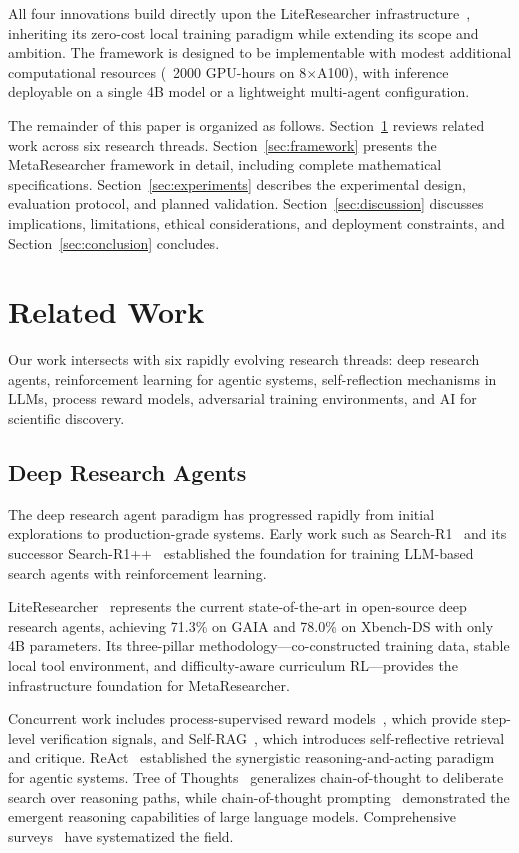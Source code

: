 \documentclass[notspecified,article,accept,pdftex,moreauthors]{Definitions/mdpi}
\begin{document}
All four innovations build directly upon the LiteResearcher infrastructure~\cite{b1}, inheriting its zero-cost local training paradigm while extending its scope and ambition. The framework is designed to be implementable with modest additional computational resources (~2000 GPU-hours on 8$\times$A100), with inference deployable on a single 4B model or a lightweight multi-agent configuration.

The remainder of this paper is organized as follows. Section~\ref{sec:related} reviews related work across six research threads. Section~\ref{sec:framework} presents the MetaResearcher framework in detail, including complete mathematical specifications. Section~\ref{sec:experiments} describes the experimental design, evaluation protocol, and planned validation. Section~\ref{sec:discussion} discusses implications, limitations, ethical considerations, and deployment constraints, and Section~\ref{sec:conclusion} concludes.
\section{Related Work}
\label{sec:related}
Our work intersects with six rapidly evolving research threads: deep research agents, reinforcement learning for agentic systems, self-reflection mechanisms in LLMs, process reward models, adversarial training environments, and AI for scientific discovery.

\subsection{Deep Research Agents}
The deep research agent paradigm has progressed rapidly from initial explorations to production-grade systems. Early work such as Search-R1~\cite{b6} and its successor Search-R1++~\cite{b7} established the foundation for training LLM-based search agents with reinforcement learning.

LiteResearcher~\cite{b1} represents the current state-of-the-art in open-source deep research agents, achieving 71.3\% on GAIA and 78.0\% on Xbench-DS with only 4B parameters. Its three-pillar methodology---co-constructed training data, stable local tool environment, and difficulty-aware curriculum RL---provides the infrastructure foundation for MetaResearcher.

Concurrent work includes process-supervised reward models~\cite{b8}, which provide step-level verification signals, and Self-RAG~\cite{b9}, which introduces self-reflective retrieval and critique. ReAct~\cite{b10} established the synergistic reasoning-and-acting paradigm for agentic systems. Tree of Thoughts~\cite{b11} generalizes chain-of-thought to deliberate search over reasoning paths, while chain-of-thought prompting~\cite{b12} demonstrated the emergent reasoning capabilities of large language models. Comprehensive surveys~\cite{b14} have systematized the field.
\end{document}
